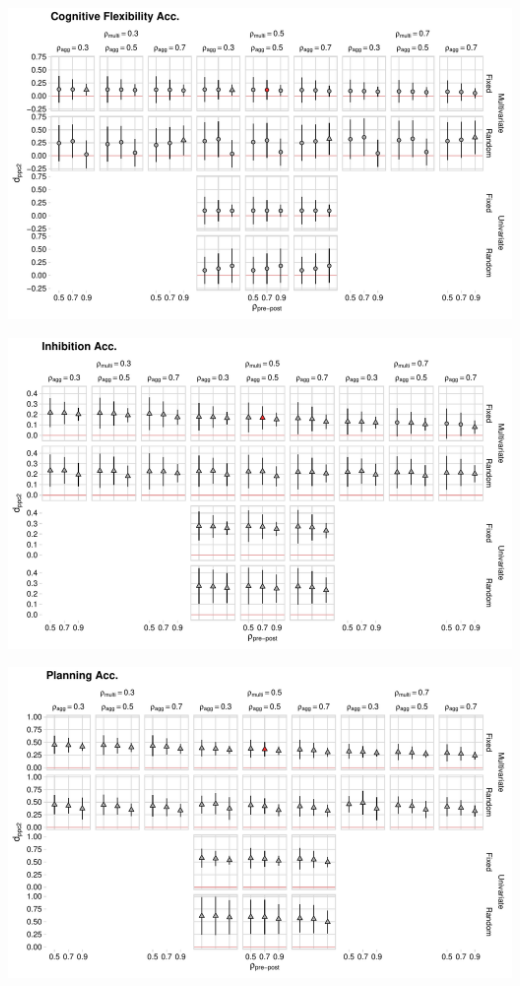 \documentclass[
]{article}
\begin{document}
\begin{landscape}




\begin{center}\includegraphics[width=648px]{supplementary_files/figure-latex/cognitive-flexibility-acc-plot-1} \end{center}


\begin{center}\includegraphics[width=648px]{supplementary_files/figure-latex/inhibition-accuracy-plot-1} \end{center}


\begin{center}\includegraphics[width=648px]{supplementary_files/figure-latex/planning-accuracy-plot-1} \end{center}



\end{landscape}
\end{document}
